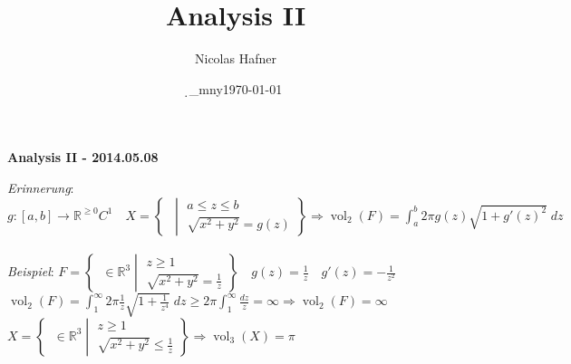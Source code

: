 \documentclass[12pt,a4paper,titlepage]{article}
\author{Nicolas Hafner}
\title{Analysis II}
\date{\d_mny\today}
\newcommand{\setR}{\mathbb{R}}
\newcommand{\vol}{\operatorname{vol}}
\newcommand{\threevec}[3]{\mathop{\left(\substack{#1 \\ #2 \\ #3}\right)}}
\begin{document}
	
\begin{center}{\bfseries\Huge Analysis II - 2014.05.08}\end{center}
\textit{Erinnerung}: $g:[a,b]\to\setR^{\geq 0}C^1 \quad X=\left\{\threevec{x}{y}{z}\middle|\substack{a\leq z\leq b \\ \sqrt{x^2+y^2}=g(z)}\right\} \Rightarrow \vol_2(F)=\int_a^b2\pi g(z)\sqrt{1+g'(z)^2} \;dz$ \\
\\
\textit{Beispiel}: $F=\left\{\threevec{x}{y}{z}\in\setR^3\middle|\substack{z\geq 1 \\ \sqrt{x^2+y^2}=\frac{1}{z}}\right\} \quad g(z)=\frac{1}{z} \quad g'(z)=-\frac{1}{z^2} $ \\
$\vol_2(F)=\int_1^\infty2\pi\frac{1}{z}\sqrt{1+\frac{1}{z^4}} \;dz \geq 2\pi\int_1^\infty\frac{dz}{z} = \infty \Rightarrow \vol_2(F)=\infty$ \\
$X=\left\{\threevec{x}{y}{z}\in\setR^3\middle|\substack{z\geq 1 \\ \sqrt{x^2+y^2}\leq\frac{1}{z}}\right\} \Rightarrow \vol_3(X)=\pi$
\end{document}
